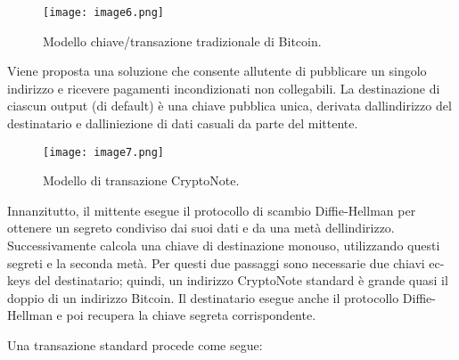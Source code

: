 \begin{figure}[h]
  \centering
  \texttt{[image: image6.png]}
  \caption{Modello chiave/transazione tradizionale di Bitcoin.}
  \label{fig:my_label}
\end{figure}

Viene proposta una soluzione che consente all\textquotesingle utente di
pubblicare un singolo indirizzo e ricevere pagamenti incondizionati non
collegabili. La destinazione di ciascun output (di default) è una chiave
pubblica unica, derivata dall\textquotesingle indirizzo del destinatario
e dall\textquotesingle iniezione di dati casuali da parte del
mittente.\\

\begin{figure}[h]
  \centering
  \texttt{[image: image7.png]}
  \caption{Modello di transazione CryptoNote.}
  \label{fig:my_label}
\end{figure}

Innanzitutto, il mittente esegue il protocollo di scambio Diffie-Hellman
per ottenere un segreto condiviso dai suoi dati e da una metà
dell\textquotesingle indirizzo. Successivamente calcola una chiave di
destinazione monouso, utilizzando questi segreti e la seconda metà. Per
questi due passaggi sono necessarie due chiavi ec-keys del destinatario;
quindi, un indirizzo CryptoNote standard è grande quasi il doppio di un
indirizzo Bitcoin. Il destinatario esegue anche il protocollo
Diffie-Hellman e poi recupera la chiave segreta corrispondente.

Una transazione standard procede come segue:

